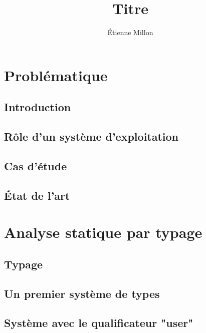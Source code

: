 \documentclass[a4,12pt]{memoir}
\title{Titre}
\author{Étienne Millon}
\begin{document}

\tableofcontents


\part{Problématique}

\chapter{Introduction}

\chapter{Rôle d'un système d'exploitation}



\chapter{Cas d'étude}



\chapter{État de l'art}



\part{Analyse statique par typage}

\chapter{Typage}



\chapter{Un premier système de types}



\chapter{Système avec le qualificateur "user"}
\end{document}
